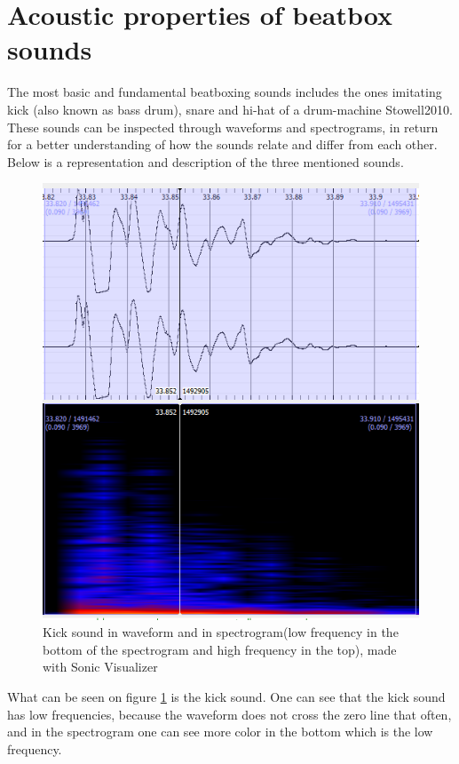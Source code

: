 \section{Acoustic properties of beatbox sounds}
The most basic and fundamental beatboxing sounds includes the ones imitating kick (also known as bass drum), snare and hi-hat of a drum-machine {Stowell2010}. These sounds can be inspected through waveforms and spectrograms, in return for a better understanding of how the sounds relate and differ from each other. Below is a representation and description of the three mentioned sounds. \\

\begin{figure}[h]
	\begin{center}
		\includegraphics[scale = 0.5]{fig/Kick-closeup-with-spectrogram.png}
		\caption{Kick sound in waveform and in spectrogram(low frequency in the bottom of the spectrogram and high frequency in the top), made with Sonic Visualizer}
		\label{KickClose}
	\end{center}
\end{figure} 

\begin{flushleft}
What can be seen on figure \ref{KickClose} is the kick sound. One can see that the kick sound has low frequencies, because the waveform does not cross the zero line that often, and in the spectrogram one can see more color in the bottom which is the low frequency.\\ 
\end{flushleft}

